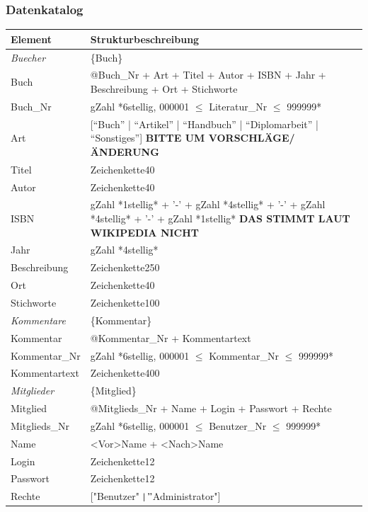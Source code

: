 \subsubsection{Datenkatalog}
\begin{longtable}{|l|p{8.5cm}|}
\hline
Element & Strukturbeschreibung \\
\hline\hline
\endhead

\emph{Buecher} & \{Buch\} \\
\hline
Buch & @Buch\_Nr + Art + Titel + Autor + ISBN + Jahr + Beschreibung + Ort + Stichworte \\
\hline
Buch\_Nr & gZahl *6stellig, 000001 $\leq$ Literatur\_Nr $\leq$ 999999* \\
\hline
Art & [``Buch'' | ``Artikel'' | ``Handbuch'' | ``Diplomarbeit'' | ``Sonstiges''] \textbf{BITTE UM VORSCHLÄGE/ÄNDERUNG}\\
\hline
Titel & Zeichenkette40 \\
\hline
Autor & Zeichenkette40 \\
\hline
ISBN & gZahl *1stellig* + '-' + gZahl *4stellig* + '-' + gZahl *4stellig* + '-' + gZahl *1stellig* \textbf{DAS STIMMT LAUT WIKIPEDIA NICHT}\\
\hline
Jahr & gZahl *4stellig* \\
\hline
Beschreibung & Zeichenkette250 \\
\hline
Ort & Zeichenkette40 \\
\hline
Stichworte & Zeichenkette100 \\
\hline\hline

\emph{Kommentare} & \{Kommentar\} \\
\hline
Kommentar & @Kommentar\_Nr + Kommentartext \\
\hline
Kommentar\_Nr & gZahl *6stellig, 000001 $\leq$ Kommentar\_Nr $\leq$ 999999* \\
\hline
Kommentartext & Zeichenkette400 \\
\hline\hline

\emph{Mitglieder} & \{Mitglied\} \\
\hline
Mitglied  & @Mitglieds\_Nr  + Name + Login + Passwort + Rechte\\
\hline
Mitglieds\_Nr & gZahl *6stellig, 000001 $\leq$ Benutzer\_Nr $\leq$ 999999* \\ 
\hline
Name & <Vor>Name + <Nach>Name \\
\hline
Login & Zeichenkette12 \\
\hline
Passwort & Zeichenkette12 \\
\hline
Rechte & ["Benutzer" $\mid "$Administrator"] \\
\hline\hline


\end{longtable}
